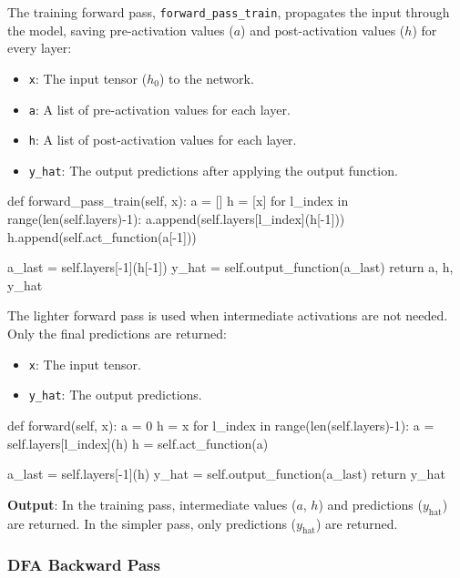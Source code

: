 \documentclass[english]{article}
\begin{document}
The training forward pass, \texttt{forward\_pass\_train}, propagates the input through the model, saving pre-activation values (\(a\)) and post-activation values (\(h\)) for every layer:

\begin{itemize}
    \item \texttt{x}: The input tensor (\(h_0\)) to the network.
    \item \texttt{a}: A list of pre-activation values for each layer.
    \item \texttt{h}: A list of post-activation values for each layer.
    \item \texttt{y\_hat}: The output predictions after applying the output function.
\end{itemize}

\begin{python}
def forward_pass_train(self, x):
    a = []
    h = [x]
    for l_index in range(len(self.layers)-1):
        a.append(self.layers[l_index](h[-1]))
        h.append(self.act_function(a[-1]))

    a_last = self.layers[-1](h[-1])
    y_hat = self.output_function(a_last)
    return a, h, y_hat
\end{python}

The lighter forward pass is used when intermediate activations are not needed. Only the final predictions are returned:

\begin{itemize}
    \item \texttt{x}: The input tensor.
    \item \texttt{y\_hat}: The output predictions.
\end{itemize}

\begin{python}
def forward(self, x):
    a = 0
    h = x
    for l_index in range(len(self.layers)-1):
        a = self.layers[l_index](h)
        h = self.act_function(a)

    a_last = self.layers[-1](h)
    y_hat = self.output_function(a_last)
    return y_hat
\end{python}

\textbf{Output}: In the training pass, intermediate values (\(a\), \(h\)) and predictions (\(y_{\text{hat}}\)) are returned. In the simpler pass, only predictions (\(y_{\text{hat}}\)) are returned.

\subsubsection{DFA Backward Pass}
\end{document}
